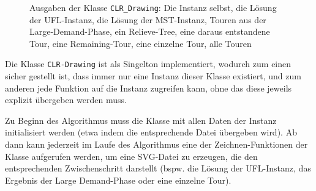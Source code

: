 \documentclass[a4paper,ngerman,11pt,bibtotoc]{scrartcl}
\theoremstyle{definition}
\theoremstyle{plain}
\theoremstyle{remark}
\newcommand{\UFL}{UFL}
\begin{document}
\begin{figure}[H]
	
	\caption{Ausgaben der Klasse \lstinline|CLR_Drawing|: Die Instanz selbst, die Lösung der UFL-Instanz, die Lösung der MST-Instanz, Touren aus der Large-Demand-Phase, ein Relieve-Tree, eine daraus entstandene Tour, eine Remaining-Tour, eine einzelne Tour, alle Touren}
\end{figure}

Die Klasse \lstinline|CLR-Drawing| ist als Singelton implementiert, wodurch zum einen sicher gestellt ist, dass immer nur eine Instanz dieser Klasse existiert, und zum anderen jede Funktion auf die Instanz zugreifen kann, ohne das diese jeweils explizit übergeben werden muss. 

Zu Beginn des Algorithmus muss die Klasse mit allen Daten der Instanz initialisiert werden (etwa indem die entsprechende Datei übergeben wird). Ab dann kann jederzeit im Laufe des Algorithmus eine der Zeichnen-Funktionen der Klasse aufgerufen werden, um eine SVG-Datei zu erzeugen, die den entsprechenden Zwischenschritt darstellt (bspw. die Lösung der \UFL-Instanz, das Ergebnis der Large Demand-Phase oder eine einzelne Tour).
\end{document}
